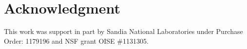 \section{Acknowledgment} \label{sec:results}

This work was support in part by Sandia National Laboratories under Purchase Order: 1179196 and  NSF grant OISE \#1131305.
